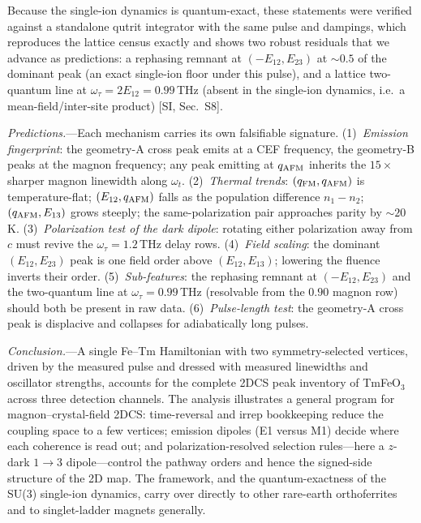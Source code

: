 \documentclass[aps,prl,twocolumn,superscriptaddress,longbibliography]{revtex4-2}
\newcommand{\qafm}{q_{\rm AFM}}
\newcommand{\qfm}{q_{\rm FM}}
\begin{document}
Because the single-ion dynamics is quantum-exact, these statements were
verified against a standalone qutrit integrator with the same pulse and
dampings, which reproduces the lattice census exactly and shows two
robust residuals that we advance as predictions: a rephasing remnant at
$(-E_{12},E_{23})$ at $\sim\!0.5$ of the dominant peak (an exact
single-ion floor under this pulse), and a lattice two-quantum line at
$\omega_\tau=2E_{12}=0.99$\,THz (absent in the single-ion dynamics,
i.e.\ a mean-field/inter-site product) [SI, Sec.~S8].

\emph{Predictions.}---Each mechanism carries its own falsifiable
signature.
(1)~\emph{Emission fingerprint}: the geometry-A cross peak emits at a
CEF frequency, the geometry-B peaks at the magnon frequency; any peak
emitting at $\qafm$ inherits the $15\times$ sharper magnon linewidth
along $\omega_t$.
(2)~\emph{Thermal trends}: $(\qfm,\qafm)$ is temperature-flat;
$(E_{12},\qafm)$ falls as the population difference $n_1-n_2$;
$(\qafm,E_{13})$ grows steeply; the same-polarization pair approaches
parity by $\sim20$\,K.
(3)~\emph{Polarization test of the dark dipole}: rotating either
polarization away from $c$ must revive the $\omega_\tau=1.2$\,THz delay
rows.
(4)~\emph{Field scaling}: the dominant $(E_{12},E_{23})$ peak is one
field order above $(E_{12},E_{13})$; lowering the fluence inverts their
order.
(5)~\emph{Sub-features}: the rephasing remnant at $(-E_{12},E_{23})$
and the two-quantum line at $\omega_\tau=0.99$\,THz (resolvable from the
$0.90$ magnon row) should both be present in raw data.
(6)~\emph{Pulse-length test}: the geometry-A cross peak is displacive
and collapses for adiabatically long pulses.

\emph{Conclusion.}---A single Fe--Tm Hamiltonian with two
symmetry-selected vertices, driven by the measured pulse and dressed
with measured linewidths and oscillator strengths, accounts for the
complete 2DCS peak inventory of TmFeO$_3$ across three detection
channels.  The analysis illustrates a general program for
magnon--crystal-field 2DCS: time-reversal and irrep bookkeeping reduce
the coupling space to a few vertices; emission dipoles (E1 versus M1)
decide where each coherence is read out; and polarization-resolved
selection rules---here a $z$-dark $1\!\to\!3$ dipole---control the
pathway orders and hence the signed-side structure of the 2D map.
The framework, and the quantum-exactness of the SU(3) single-ion
dynamics, carry over directly to other rare-earth orthoferrites and to
singlet-ladder magnets generally.
\end{document}
